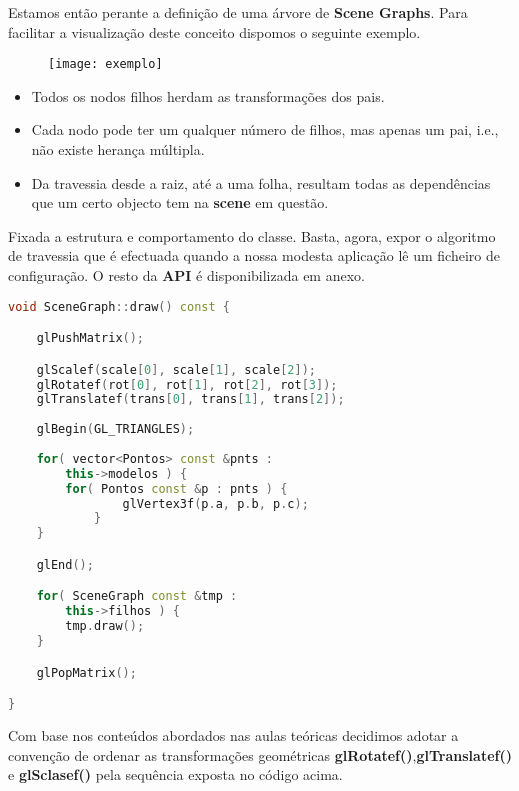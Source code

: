 \documentclass{article}
\begin{document}
Estamos então perante a definição de uma árvore de \textbf{Scene Graphs}. Para facilitar a visualização deste conceito dispomos o seguinte exemplo.

\begin{figure}[H]
    \centering
    \texttt{[image: exemplo]}
\end{figure}

\begin{info}
    \begin{itemize}
        \item Todos os nodos filhos herdam as transformações dos pais.
        \item Cada nodo pode ter um qualquer número de filhos, mas apenas um pai, i.e., não existe herança múltipla.
        \item Da travessia desde a raiz, até a uma folha, resultam todas as dependências que um certo objecto tem na \textbf{scene} em questão.
    \end{itemize}
\end{info}

Fixada a estrutura e comportamento do classe. Basta, agora, expor o algoritmo de travessia que é efectuada quando a nossa modesta aplicação lê um ficheiro de configuração. O resto da \textbf{API} é disponibilizada em anexo.

\begin{file}
    \begin{lstlisting}[language=C++]
void SceneGraph::draw() const {

	glPushMatrix();

	glScalef(scale[0], scale[1], scale[2]);
	glRotatef(rot[0], rot[1], rot[2], rot[3]);
	glTranslatef(trans[0], trans[1], trans[2]);
	
	glBegin(GL_TRIANGLES);
	
	for( vector<Pontos> const &pnts : 
		this->modelos ) {	
		for( Pontos const &p : pnts ) {
        		glVertex3f(p.a, p.b, p.c);
    		}
	}

	glEnd();

	for( SceneGraph const &tmp : 
		this->filhos ) {
		tmp.draw();
	}

	glPopMatrix();

}   
    \end{lstlisting}
\end{file}

\begin{info}
Com base nos conteúdos abordados nas aulas teóricas decidimos adotar a convenção de ordenar as transformações geométricas \textbf{glRotatef()},\textbf{glTranslatef()} e \textbf{glSclasef()} pela sequência exposta no código acima.
\end{info}
\end{document}
